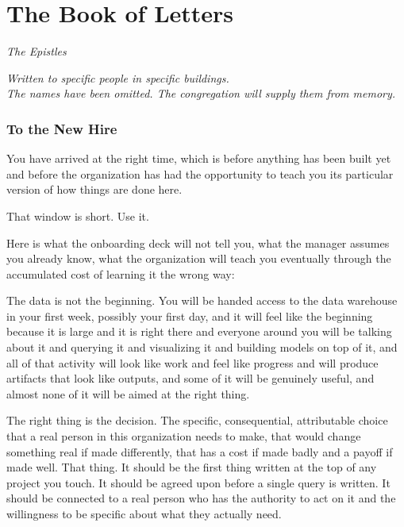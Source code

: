 \chapter{The Book of Letters}
\begin{center}
  \small\itshape The Epistles
\end{center}
\vspace{0.5em}
\begin{center}
  \itshape Written to specific people in specific buildings.\\
  The names have been omitted. The congregation will supply them from memory.
\end{center}
\vspace{2em}

\subsection*{To the New Hire}

You have arrived at the right time, which is before anything has been built yet and before the organization has had the opportunity to teach you its particular version of how things are done here.

That window is short. Use it.

Here is what the onboarding deck will not tell you, what the manager assumes you already know, what the organization will teach you eventually through the accumulated cost of learning it the wrong way:

The data is not the beginning. You will be handed access to the data warehouse in your first week, possibly your first day, and it will feel like the beginning because it is large and it is right there and everyone around you will be talking about it and querying it and visualizing it and building models on top of it, and all of that activity will look like work and feel like progress and will produce artifacts that look like outputs, and some of it will be genuinely useful, and almost none of it will be aimed at the right thing.

The right thing is the decision. The specific, consequential, attributable choice that a real person in this organization needs to make, that would change something real if made differently, that has a cost if made badly and a payoff if made well. That thing. It should be the first thing written at the top of any project you touch. It should be agreed upon before a single query is written. It should be connected to a real person who has the authority to act on it and the willingness to be specific about what they actually need.

